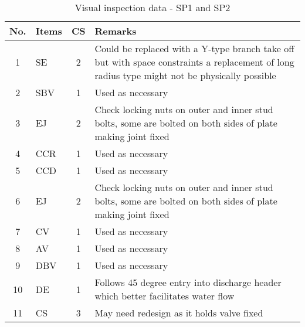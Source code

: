 \begin{table}[!h]
	\caption{Visual inspection data - SP1 and SP2}
	\label{ch04_visualinspectionsp1}
		{\scriptsize
\begin{tabular}{c|l|c|p{12cm}}
\hline
No. & Items & CS & Remarks \\ 
\hline
1 & SE & 2 & Could be replaced with a Y-type branch take off but with space constraints a replacement of long radius type might not be physically possible \\ 
2 & SBV & 1 & Used as necessary \\ 
3 & EJ & 2 & Check locking nuts on outer and inner stud bolts, some are bolted on both sides of plate making joint fixed \\ 
4 & CCR & 1 & Used as necessary \\ 
5 & CCD & 1 & Used as necessary \\ 
6 & EJ & 2 & Check locking nuts on outer and inner stud bolts, some are bolted on both sides of plate making joint fixed \\ 
7 & CV & 1 & Used as necessary \\ 
8 & AV & 1 & Used as necessary \\ 
9 & DBV & 1 & Used as necessary \\ 
10 & DE & 1 & Follows 45 degree entry into discharge header which better facilitates water flow \\ 
11 & CS & 3 & May need redesign as it holds valve fixed \\ 
\hline
\end{tabular}
	}
\end{table}



